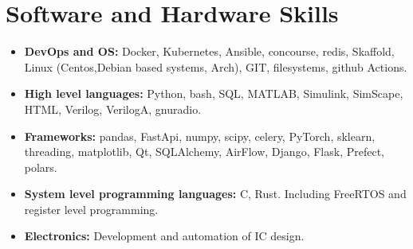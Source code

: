 \documentclass{article}
\begin{document}

\section{Software and Hardware Skills}

\begin{itemize}
   \item \textbf{DevOps and OS:} Docker, Kubernetes, Ansible, concourse, redis, Skaffold, Linux (Centos,Debian based systems, Arch), GIT, filesystems, github Actions.
   \item \textbf{High level languages:} Python, bash, SQL, MATLAB, Simulink, SimScape, HTML, Verilog, VerilogA, gnuradio.
   \item \textbf{Frameworks:} pandas, FastApi, numpy, scipy, celery, PyTorch, sklearn, threading, matplotlib, Qt, SQLAlchemy, AirFlow, Django, Flask, Prefect, polars.
   \item \textbf{System level programming languages:} C, Rust. Including FreeRTOS and register level programming.
   \item \textbf{Electronics:} Development and automation of IC design.

\end{itemize}
\end{document}
